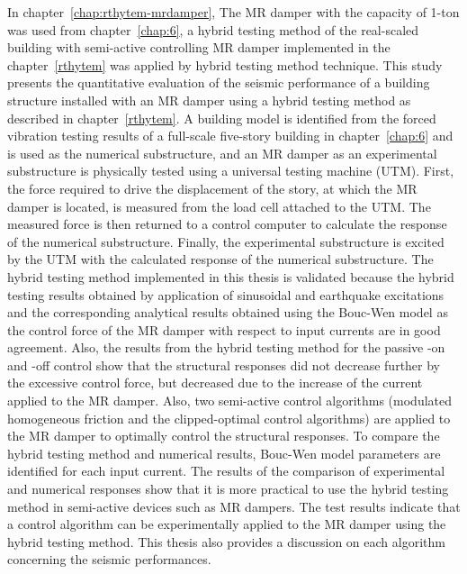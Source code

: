 In chapter~\ref{chap:rthytem-mrdamper}, The MR damper with the capacity of 1-ton was used from chapter~\ref{chap:6}, a hybrid testing method of the real-scaled building with semi-active controlling MR damper implemented in the chapter~\ref{rthytem} was applied by hybrid testing method technique. This study presents the quantitative evaluation of the seismic performance of a building structure installed with an MR damper using a hybrid testing method as described in chapter~\ref{rthytem}. A building model is identified from the forced vibration testing results of a full-scale five-story building in chapter~\ref{chap:6} and is used as the numerical substructure, and an MR damper as an experimental substructure is physically tested using a universal testing machine (UTM). First, the force required to drive the displacement of the story, at which the MR damper is located, is measured from the load cell attached to the UTM. The measured force is then returned to a control computer to calculate the response of the numerical substructure. Finally, the experimental substructure is excited by the UTM with the calculated response of the numerical substructure. The hybrid testing method implemented in this thesis is validated because the hybrid testing results obtained by application of sinusoidal and earthquake excitations and the corresponding analytical results obtained using the Bouc-Wen model as the control force of the MR damper with respect to input currents are in good agreement. Also, the results from the hybrid testing method for the passive -on and -off control show that the structural responses did not decrease further by the excessive control force, but decreased due to the increase of the current applied to the MR damper. Also, two semi-active control algorithms (modulated homogeneous friction and the clipped-optimal control algorithms) are applied to the MR damper to optimally control the structural responses. To compare the hybrid testing method and numerical results, Bouc-Wen model parameters are identified for each input current. The results of the comparison of experimental and numerical responses show that it is more practical to use the hybrid testing method in semi-active devices such as MR dampers. The test results indicate that a control algorithm can be experimentally applied to the MR damper using the hybrid testing method. This thesis also provides a discussion on each algorithm concerning the seismic performances.
